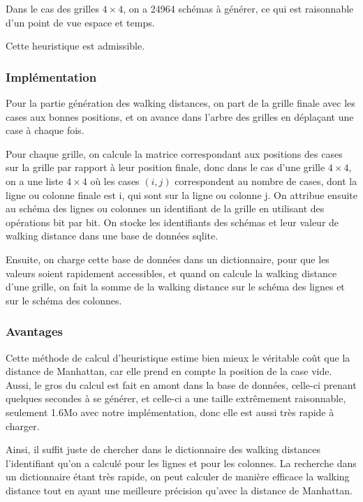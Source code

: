 \documentclass[a4paper, 12pt]{article}
\begin{document}
Dans le cas des grilles $4 \times 4$, on a 24964 schémas à générer, ce qui est raisonnable d'un point de vue espace et temps.

Cette heuristique est admissible.

\subsubsection{Implémentation}

Pour la partie génération des walking distances, on part de la grille finale avec les cases aux bonnes positions, et on avance dans l'arbre des grilles en déplaçant une case à chaque fois.

Pour chaque grille, on calcule la matrice correspondant aux positions des cases sur la grille par rapport à leur position finale, donc dans le cas d'une grille $4 \times 4$, on a une liste $4 \times 4$ où les cases $(i, j)$ correspondent au nombre de cases, dont la ligne ou colonne finale est i, qui sont sur la ligne ou colonne j.
On attribue ensuite au schéma des lignes ou colonnes un identifiant de la grille en utilisant des opérations bit par bit.
On stocke les identifiants des schémas et leur valeur de walking distance dans une base de données sqlite.

Ensuite, on charge cette base de données dans un dictionnaire, pour que les valeurs soient rapidement accessibles, et quand on calcule la walking distance d'une grille, on fait la somme de la walking distance sur le schéma des lignes et sur le schéma des colonnes.

\subsubsection{Avantages}

Cette méthode de calcul d'heuristique estime bien mieux le véritable coût que la distance de Manhattan, car elle prend en compte la position de la case vide. Aussi, le gros du calcul est fait en amont dans la base de données, celle-ci prenant quelques secondes à se générer, et celle-ci a une taille extrêmement raisonnable, seulement 1.6Mo avec notre implémentation, donc elle est aussi très rapide à charger.

Ainsi, il suffit juste de chercher dans le dictionnaire des walking distances l'identifiant qu'on a calculé pour les lignes et pour les colonnes.
La recherche dans un dictionnaire étant très rapide, on peut calculer de manière efficace la walking distance tout en ayant une meilleure précision qu'avec la distance de Manhattan.
\end{document}
